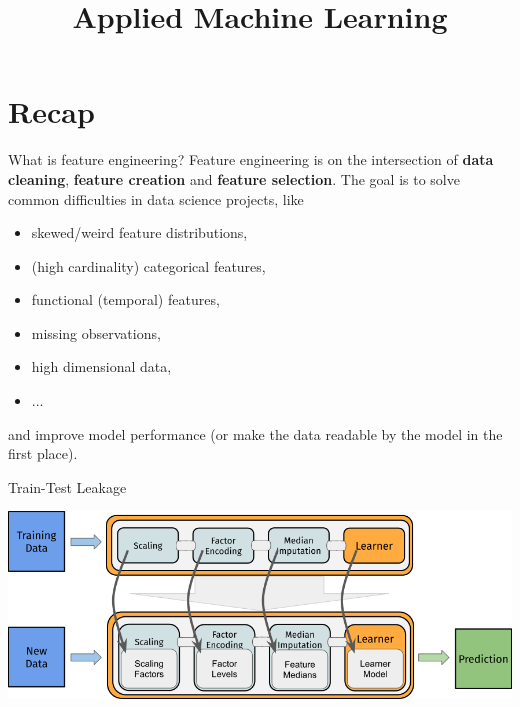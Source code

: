 \documentclass[11pt,compress,t,notes=noshow, xcolor=table]{beamer}
\title{Applied Machine Learning}
\date{}
\begin{document}


\section{Recap}

\begin{frame}{What is feature engineering?}
Feature engineering is on the intersection of \textbf{data cleaning}, \textbf{feature
creation} and \textbf{feature selection}.
\vfill
The goal is to solve common difficulties in data science projects, like
\vfill
\begin{itemize}
    \item skewed/weird feature distributions,
    \item (high cardinality) categorical features,
    \item functional (temporal) features,
    \item missing observations,
    \item high dimensional data,
    \item ...
\end{itemize}
\vfill
and improve model performance (or make the data readable by the model in the first place).
\end{frame}

\begin{frame}{Train-Test Leakage}
% 
\begin{center}
\includegraphics[width=\textwidth]{figure_man/pipe_action.png}
\end{center}

\end{frame}
\end{document}
